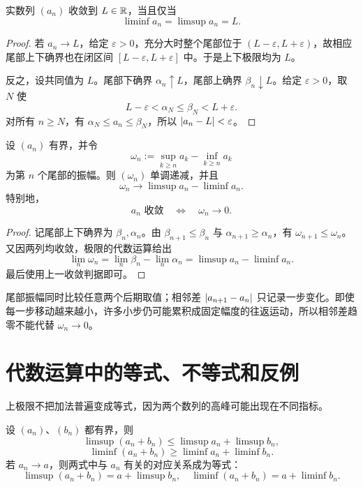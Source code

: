 \begin{theorem}
实数列 \((a_n)\) 收敛到 \(L\in\mathbb{R}\)，当且仅当
\[
 \liminf a_n=\limsup a_n=L.
\]
\end{theorem}

\begin{proof}
若 \(a_n\to L\)，给定 \(\varepsilon>0\)，充分大时整个尾部位于
\((L-\varepsilon,L+\varepsilon)\)，故相应尾部上下确界也在闭区间
\([L-\varepsilon,L+\varepsilon]\) 中。于是上下极限均为 \(L\)。

反之，设共同值为 \(L\)。尾部下确界 \(\alpha_n\uparrow L\)，尾部上确界 \(\beta_n\downarrow L\)。给定 \(\varepsilon>0\)，取 \(N\) 使
\[
 L-\varepsilon<\alpha_N\le\beta_N<L+\varepsilon.
\]
对所有 \(n\ge N\)，有
\(\alpha_N\le a_n\le\beta_N\)，所以 \(\left|a_n-L\right|<\varepsilon\)。
\end{proof}

\begin{proposition}[尾部振幅]
设 \((a_n)\) 有界，并令
\[
 \omega_n:=\sup_{k\ge n}a_k-\inf_{k\ge n}a_k
\]
为第 \(n\) 个尾部的振幅。则 \((\omega_n)\) 单调递减，并且
\[
 \omega_n\longrightarrow
 \limsup a_n-\liminf a_n.
\]
特别地，
\[
 a_n\text{ 收敛}\quad\Longleftrightarrow\quad\omega_n\to0.
\]
\end{proposition}

\begin{proof}
记尾部上下确界为 \(\beta_n,\alpha_n\)。由
\(\beta_{n+1}\le\beta_n\) 与
\(\alpha_{n+1}\ge\alpha_n\)，有
\(\omega_{n+1}\le\omega_n\)。又因两列均收敛，极限的代数运算给出
\[
 \lim_n\omega_n
 =\lim_n\beta_n-\lim_n\alpha_n
 =\limsup a_n-\liminf a_n.
\]
最后使用上一收敛判据即可。
\end{proof}

尾部振幅同时比较任意两个后期取值；相邻差
\(\left|a_{n+1}-a_n\right|\) 只记录一步变化。即使每一步移动越来越小，许多小步仍可能累积成固定幅度的往返运动，所以相邻差趋零不能代替 \(\omega_n\to0\)。

\section{代数运算中的等式、不等式和反例}


上极限不把加法普遍变成等式，因为两个数列的高峰可能出现在不同指标。

\begin{theorem}[和的上下极限不等式]
设 \((a_n)\)、\((b_n)\) 都有界，则
\[
 \limsup(a_n+b_n)
 \le\limsup a_n+\limsup b_n,
\]
\[
 \liminf(a_n+b_n)
 \ge\liminf a_n+\liminf b_n.
\]
若 \(a_n\to a\)，则两式中与 \(a_n\) 有关的对应关系成为等式：
\[
 \limsup(a_n+b_n)=a+\limsup b_n,
\quad
 \liminf(a_n+b_n)=a+\liminf b_n.
\]
\end{theorem}


